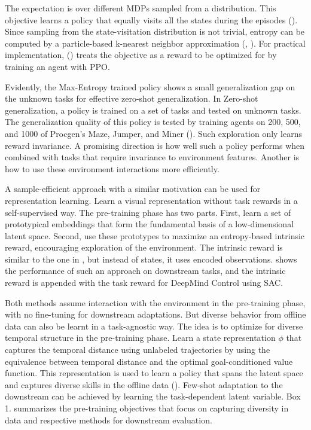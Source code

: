 \documentclass{article}
\begin{document}
The expectation is over different MDPs sampled from a distribution. This objective learns a policy that equally visits all the states during the episodes (\cite{zisselman2023explore}). Since sampling from the state-visitation distribution is not trivial, entropy can be computed by a particle-based k-nearest neighbor approximation (\cite{zisselman2023explore}, \cite{yarats2021reinforcement}). For practical implementation, (\cite{zisselman2023explore}) treats the objective as a reward to be optimized for by training an agent with PPO. 

Evidently, the Max-Entropy trained policy shows a small generalization gap on the unknown tasks for effective zero-shot generalization. In Zero-shot generalization, a policy is trained on a set of tasks and tested on unknown tasks. The generalization quality of this policy is tested by training agents on 200, 500, and 1000 of Procgen's Maze, Jumper, and Miner (\cite{zisselman2023explore}). Such exploration only learns reward invariance. A promising direction is how well such a policy performs when combined with tasks that require invariance to environment features. Another is how to use these environment interactions more efficiently. 

A sample-efficient approach with a similar motivation can be used for representation learning. Learn a visual representation without task rewards in a self-supervised way. The pre-training phase has two parts. First, learn a set of prototypical embeddings that form the fundamental basis of a low-dimensional latent space. Second, use these prototypes to maximize an entropy-based intrinsic reward, encouraging exploration of the environment. The intrinsic reward is similar to the one in \cite{zisselman2023explore}, but instead of states, it uses encoded observations. \cite{yarats2021reinforcement} shows the performance of such an approach on downstream tasks, and the intrinsic reward is appended with the task reward for DeepMind Control using SAC. 

Both methods assume interaction with the environment in the pre-training phase, with no fine-tuning for downstream adaptations. But diverse behavior from offline data can also be learnt in a task-agnostic way. The idea is to optimize for diverse temporal structure in the pre-training phase. Learn a state representation $\phi$ that captures the temporal distance using unlabeled trajectories by using the equivalence between temporal distance and the optimal goal-conditioned value function. This representation is used to learn a policy that spans the latent space and captures diverse skills in the offline data (\cite{park2024foundation}). Few-shot adaptation to the downstream can be achieved by learning the task-dependent latent variable.
Box 1. summarizes the pre-training objectives that focus on capturing diversity in data and respective methods for downstream evaluation.
\end{document}
